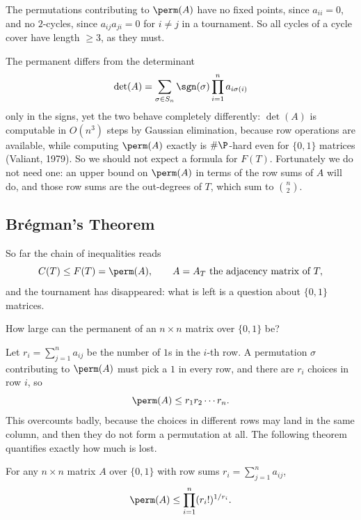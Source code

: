 \begin{remark}
    The permutations contributing to \(\perm(A)\) have no fixed points, since \(a_{ii} = 0\), and no \(2\)-cycles, since \(a_{ij} a_{ji} = 0\) for \(i \ne j\) in a tournament. So all cycles of a cycle cover have length \(\ge 3\), as they must.
\end{remark}

The permanent differs from the determinant
\[
    \det(A) = \sum_{\sigma \in S_n} \sgn(\sigma) \prod_{i=1}^{n} a_{i\sigma(i)}
\]
only in the signs, yet the two behave completely differently: \(\det(A)\) is computable in \(O(n^3)\) steps by Gaussian elimination, because row operations are available, while computing \(\perm(A)\) exactly is \(\# \P\)-hard even for \(\{0,1\}\) matrices (Valiant, 1979). So we should not expect a formula for \(F(T)\). Fortunately we do not need one: an upper bound on \(\perm(A)\) in terms of the row sums of \(A\) will do, and those row sums are the out-degrees of \(T\), which sum to \(\binom{n}{2}\).

\subsection{Br\'egman's Theorem}

So far the chain of inequalities reads
\[
    C(T) \le F(T) = \perm(A), \qquad A = A_T \text{ the adjacency matrix of } T,
\]
and the tournament has disappeared: what is left is a question about \(\{0,1\}\) matrices.

\begin{question}\label{q:permanent}
    How large can the permanent of an \(n \times n\) matrix over \(\{0,1\}\) be?
\end{question}

Let \(r_i = \sum_{j=1}^{n} a_{ij}\) be the number of \(1\)s in the \(i\)-th row. A permutation \(\sigma\) contributing to \(\perm(A)\) must pick a \(1\) in every row, and there are \(r_i\) choices in row \(i\), so
\begin{equation}\label{eq:perm-trivial}
    \perm(A) \le r_1 r_2 \cdots r_n.
\end{equation}
This overcounts badly, because the choices in different rows may land in the same column, and then they do not form a permutation at all. The following theorem quantifies exactly how much is lost.

\begin{theorem}\label{thm:bregman}
    For any \(n \times n\) matrix \(A\) over \(\{0,1\}\) with row sums \(r_i = \sum_{j=1}^{n} a_{ij}\),
    \[
        \perm(A) \le \prod_{i=1}^{n} (r_i!)^{1/r_i}.
    \]
\end{theorem}

